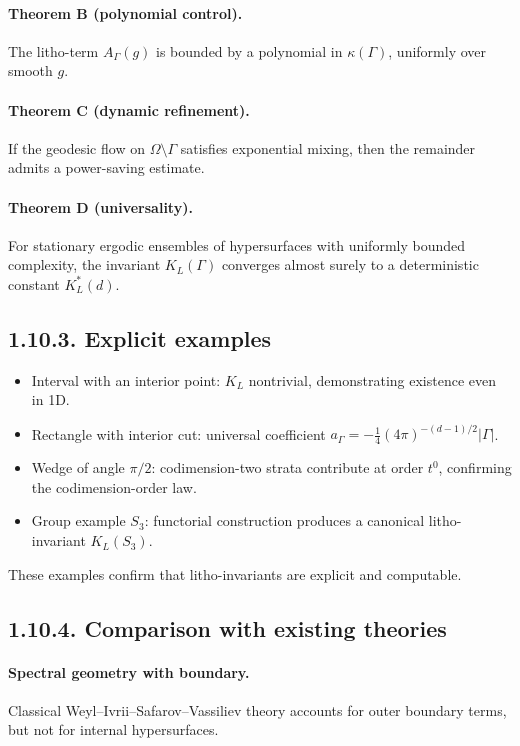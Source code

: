 \paragraph{Theorem B (polynomial control).}
The litho-term $A_\Gamma(g)$ is bounded by
a polynomial in $\kappa(\Gamma)$,
uniformly over smooth $g$.

\paragraph{Theorem C (dynamic refinement).}
If the geodesic flow on $\Omega\setminus\Gamma$
satisfies exponential mixing,
then the remainder admits a power-saving estimate.

\paragraph{Theorem D (universality).}
For stationary ergodic ensembles of hypersurfaces
with uniformly bounded complexity,
the invariant $K_L(\Gamma)$ converges almost surely
to a deterministic constant $K_L^*(d)$.

\subsection*{1.10.3. Explicit examples}

\begin{itemize}
\item Interval with an interior point:
$K_L$ nontrivial, demonstrating existence even in 1D.
\item Rectangle with interior cut:
universal coefficient $a_\Gamma = -\tfrac14(4\pi)^{-(d-1)/2}|\Gamma|$.
\item Wedge of angle $\pi/2$:
codimension-two strata contribute at order $t^0$,
confirming the codimension-order law.
\item Group example $S_3$:
functorial construction produces a canonical litho-invariant $K_L(S_3)$.
\end{itemize}

These examples confirm that litho-invariants are explicit and computable.

\subsection*{1.10.4. Comparison with existing theories}

\paragraph{Spectral geometry with boundary.}
Classical Weyl–Ivrii–Safarov–Vassiliev theory
accounts for outer boundary terms,
but not for internal hypersurfaces.

